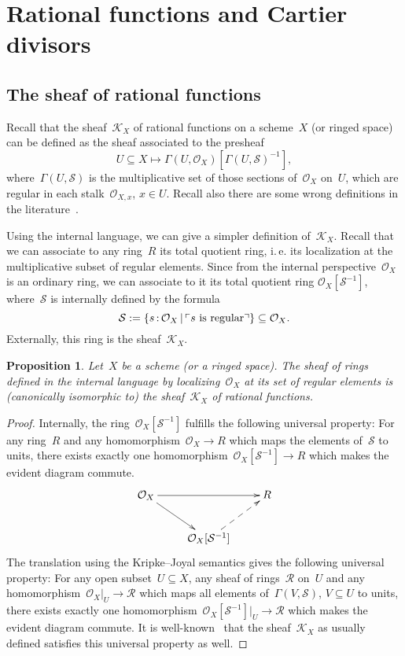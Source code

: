 \documentclass[10pt]{amsart}
\theoremstyle{definition}
\theoremstyle{plain}
\newtheorem{prop}[defn]{Proposition}
\theoremstyle{remark}
\renewcommand{\O}{\mathcal{O}}
\newcommand{\K}{\mathcal{K}}
\newcommand{\R}{\mathcal{R}}
\renewcommand{\S}{\mathcal{S}}
\newcommand{\?}{\,{:}\,}
\renewcommand{\_}{\mathpunct{.}\,}
\newcommand{\speak}[1]{\ulcorner\text{\textnormal{#1}}\urcorner}
\begin{document}
\section{Rational functions and Cartier divisors}

\subsection{The sheaf of rational functions} Recall that the sheaf~$\K_X$ of rational
functions on a scheme~$X$ (or ringed space) can be defined as the sheaf
associated to the presheaf
\[ U \subseteq X \longmapsto \Gamma(U,\O_X)[\Gamma(U,\S)^{-1}], \]
where~$\Gamma(U,\S)$ is the multiplicative set of those sections of~$\O_X$ on~$U$,
which are regular in each stalk~$\O_{X,x}$, $x \in U$. Recall also there are
some wrong definitions in the literature~\cite{kleiman:misconceptions}.

Using the internal language, we can give a simpler definition of~$\K_X$.
Recall that we can associate to any ring~$R$ its total quotient ring, i.\,e.
its localization at the multiplicative subset of regular elements. Since from
the internal perspective~$\O_X$ is an ordinary ring, we can associate to it its
total quotient ring $\O_X[\S^{-1}]$,
where~$\S$ is internally defined by the formula
\[ \S := \{ s\?\O_X \,|\, \speak{$s$ is regular} \} \subseteq \O_X. \]
Externally, this ring is the sheaf~$\K_X$.
\begin{prop}Let~$X$ be a scheme (or a ringed space). The sheaf of rings defined
in the internal language by localizing~$\O_X$ at its set of regular elements is
(canonically isomorphic to) the sheaf~$\K_X$ of rational functions.
\end{prop}
\begin{proof}Internally, the ring~$\O_X[\S^{-1}]$ fulfills the following
universal property: For any ring~$R$ and any homomorphism~$\O_X \to R$ which
maps the elements of~$\S$ to units, there exists exactly one
homomorphism~$\O_X[\S^{-1}] \to R$ which makes the evident diagram commute.
\[ \xymatrix{
  \O_X \ar[rr] \ar[dr] && R \\
  & \O_X[\S^{-1}] \ar@{-->}[ru]
} \]
The translation using the Kripke--Joyal semantics gives the following universal
property: For any open subset~$U \subseteq X$, any sheaf of rings~$\R$ on~$U$ and any
homomorphism~$\O_X|_U \to \R$ which maps all elements of~$\Gamma(V,\S)$, $V
\subseteq U$ to units, there exists exactly one homomorphism~$\O_X[\S^{-1}]|_U \to
\R$ which makes the evident diagram commute.
It is well-known~\cite{???} that the sheaf~$\K_X$ as usually defined satisfies
this universal property as well.
\end{proof}
\end{document}
